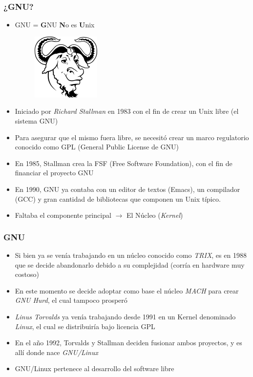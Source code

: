 \begin{frame}
	\frametitle{¿GNU?}
	\begin{itemize}
		\item GNU = \textbf{G}NU \textbf{N}o es \textbf{U}nix
		\begin{figure}
			\centering
			\includegraphics[scale=0.2]{images/gnu.png}
		\end{figure}
		\item Iniciado por \emph{Richard Stallman} en 1983 con el fin de crear un Unix libre (el sistema GNU)
		\item Para asegurar que el mismo fuera libre, se necesitó crear un marco regulatorio conocido como GPL (General Public License de GNU)
		\item En 1985, Stallman crea la FSF (Free Software Foundation), con el fin de financiar el proyecto GNU
		\item En 1990, GNU ya contaba con un editor de textos (Emacs), un compilador (GCC) y gran cantidad de bibliotecas que componen un Unix típico.
		\item Faltaba el componente principal $\rightarrow$ El Núcleo (\textit{Kernel})
	\end{itemize}
\end{frame}

\begin{frame}
	\frametitle{GNU}
	\begin{itemize}
		\item Si bien ya se venía trabajando en un núcleo conocido como \textit{TRIX}, es en 1988 que se decide abandonarlo debido a su complejidad (corría en hardware muy costoso)
		\item En este momento se decide adoptar como base el núcleo \textit{MACH} para crear \textit{GNU Hurd}, el cual tampoco prosperó
		\item \emph{Linus Torvalds} ya venía trabajando desde 1991 en un Kernel denominado \textit{Linux}, el cual se distribuiría bajo licencia GPL
		\item En el año 1992, Torvalds y Stallman deciden fusionar ambos proyectos, y es allí donde nace \textit{GNU/Linux}
		\item GNU/Linux pertenece al desarrollo del software libre	
	\end{itemize}
\end{frame}

